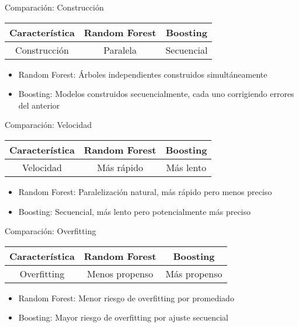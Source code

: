 \documentclass{beamer}
\begin{document}
\begin{frame}{Comparación: Construcción}
    \begin{center}
    \begin{tabular}{|c|c|c|}
        \hline
        \textbf{Característica} & \textbf{Random Forest} & \textbf{Boosting} \\
        \hline
        Construcción & Paralela & Secuencial \\
        \hline
    \end{tabular}
    \end{center}
    \begin{itemize}
        \item Random Forest: Árboles independientes construidos simultáneamente
        \item Boosting: Modelos construidos secuencialmente, cada uno corrigiendo errores del anterior
    \end{itemize}
\end{frame}

\begin{frame}{Comparación: Velocidad}
    \begin{center}
    \begin{tabular}{|c|c|c|}
        \hline
        \textbf{Característica} & \textbf{Random Forest} & \textbf{Boosting} \\
        \hline
        Velocidad & Más rápido & Más lento \\
        \hline
    \end{tabular}
    \end{center}
    \begin{itemize}
        \item Random Forest: Paralelización natural, más rápido pero menos preciso
        \item Boosting: Secuencial, más lento pero potencialmente más preciso
    \end{itemize}
\end{frame}

\begin{frame}{Comparación: Overfitting}
    \begin{center}
    \begin{tabular}{|c|c|c|}
        \hline
        \textbf{Característica} & \textbf{Random Forest} & \textbf{Boosting} \\
        \hline
        Overfitting & Menos propenso & Más propenso \\
        \hline
    \end{tabular}
    \end{center}
    \begin{itemize}
        \item Random Forest: Menor riesgo de overfitting por promediado
        \item Boosting: Mayor riesgo de overfitting por ajuste secuencial
    \end{itemize}
\end{frame}
\end{document}
